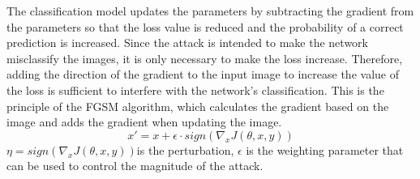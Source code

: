 The classification model updates the parameters by subtracting the gradient from the parameters so that the loss value is reduced and the probability of a correct prediction is increased. Since the attack is intended to make the network misclassify the images, it is only necessary to make the loss increase. Therefore, adding the direction of the gradient to the input image to increase the value of the loss is sufficient to interfere with the network's classification. This is the principle of the FGSM algorithm, which calculates the gradient based on the image and adds the gradient when updating the image.\\
\begin{equation}
    x' = x + \epsilon \cdot sign(\nabla_{x}J(\theta, x, y))
\end{equation}
$\eta = sign(\nabla_{x}J(\theta, x, y))$is the perturbation, $\epsilon$ is the weighting parameter that can be used to control the magnitude of the attack. 